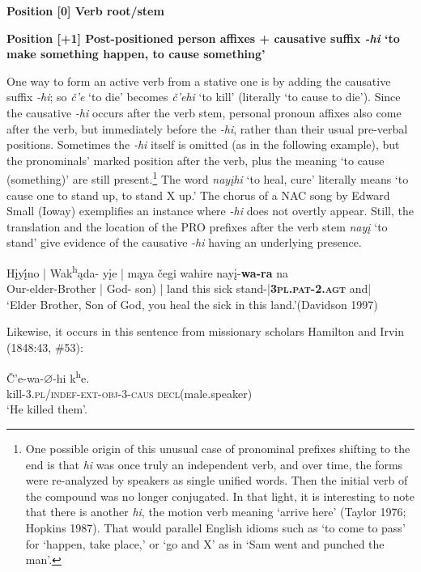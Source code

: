 \documentclass[output=paper]{LSP/langsci}
\begin{document}
\textbf{Position [0]  Verb root/stem}

\vspace{1em}
\textbf{Position [+1] Post-positioned person affixes + causative suffix  \textit{-hi} `to make something happen, to cause something'}

One way to form an active verb from a stative one is by adding the causative suffix \textit{-hi}; so \textit{\v{c}'e} `to die' becomes \textit{\v{c}'ehi} `to kill' (literally `to cause to die'). Since the causative \textit{-hi} occurs after the verb stem, personal pronoun affixes also come after the verb, but immediately before the \textit{-hi}, rather than their usual pre-verbal positions.  Sometimes the \textit{-hi} itself is omitted (as in the following example), but the pronominals' marked position after the verb, plus the meaning `to cause (something)' are still present.\footnote{One possible origin of this unusual case of pronominal prefixes shifting to the end is that \textit{hi} was once truly an independent verb, and over time, the forms were re-analyzed by speakers as single unified words. Then the initial verb of the compound was no longer conjugated. In that light, it is interesting to note that there is another \textit{hi}, the motion verb meaning `arrive here' (Taylor 1976; Hopkins 1987). That would parallel English idioms such as `to come to pass' for `happen, take place,' or `go and X' as in `Sam went and punched the man'.}  The word \textit{nay\k{i}hi}  `to heal, cure' literally means `to cause one to stand up, to stand X up.'  The chorus of a NAC song by Edward Small (Ioway) exemplifies an instance where  \textit{-hi} does not overtly appear.  Still, the translation and the location of the PRO prefixes after the verb stem \textit{nay\k{i}} `to stand' give evidence of the causative \textit{-hi} having an underlying presence.

\begin{exe}
\ex \gll H\k{i}y\k{\'i}no | Wak\textsuperscript{h}\k{a}da- y\k{i}e   | m\k{a}ya  \v{c}egi  wahire nay\k{i}-\textbf{wa-ra} na \\
Our-elder-Brother | God- son)    | land   this   sick      stand-|\textbf{\textsc{3pl.pat-2.agt}} and|\\
\trans `Elder Brother, Son of God, you heal the sick in this land.'(Davidson 1997)
 \end{exe}

Likewise, it occurs in this sentence from missionary scholars Hamilton and Irvin (1848:43, \#53):
\begin{exe}
\ex \gll \v{C}'e-wa-{\ob}$\varnothing${\cb}-hi       k\textsuperscript{h}e. \\
   	kill-3.\textsc{pl/indef-ext-obj}-3-\textsc{caus} \textsc{decl}(male.speaker)  \\
\trans `He killed them'.	
\end{exe}
\end{document}
